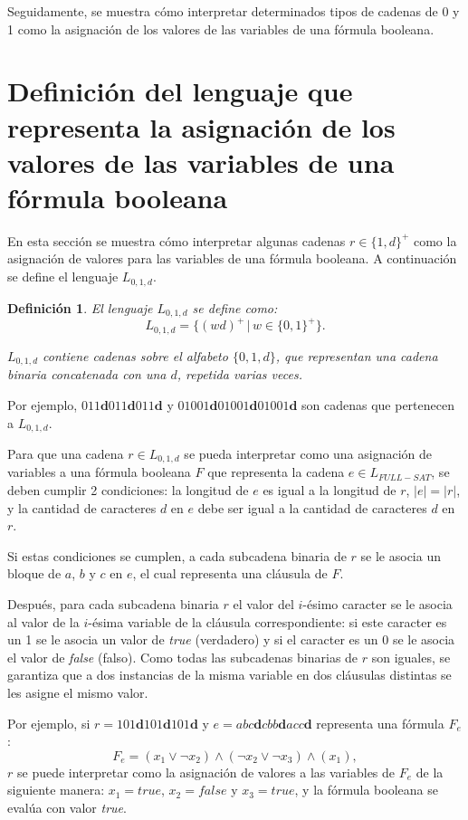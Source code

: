 \documentclass[12pt]{article}
\newtheorem{definition}{Definición}
\newcommand{\true}{\textit{true}}
\newcommand{\false}{\textit{false}}
\begin{document}
Seguidamente, se muestra cómo interpretar determinados tipos de cadenas de 0 y 1 como la asignación de los valores de las variables de una fórmula booleana.

\section{Definición del lenguaje que representa la asignación de los valores de las variables de una fórmula booleana}
\label{sec:intsat}

En esta sección se muestra cómo interpretar algunas cadenas $r\in \{1,d\}^+$ como la asignación de valores para las variables de una fórmula booleana.
A continuación se define el lenguaje $L_{0,1,d}$.


\begin{definition}
    El lenguaje $L_{0,1,d}$ se define como:
    $$L_{0,1,d}=\{(wd)^+\,|\,w\in\{0,1\}^+\}.$$
    
    $L_{0,1,d}$ contiene cadenas sobre el alfabeto $\{0,1,d\}$, que representan una cadena binaria concatenada con una $d$,
    repetida varias veces.
\end{definition}

Por ejemplo, $011\mathbf{d}011\mathbf{d}011\mathbf{d}$ y $01001\mathbf{d}01001\mathbf{d}01001\mathbf{d}$ son cadenas que pertenecen a
$L_{0,1,d}$.

Para que una cadena $r\in L_{0,1,d}$ se pueda interpretar como una asignación de variables a una fórmula booleana $F$ que representa la cadena $e\in L_{FULL-SAT}$, se deben cumplir 2 condiciones: la longitud de $e$ es igual a la longitud de $r$, $|e|=|r|$, y la cantidad de caracteres $d$ en $e$ debe ser igual a la cantidad de caracteres $d$ en $r$. 

Si estas condiciones se cumplen, a cada subcadena binaria de $r$ se le asocia un bloque de $a$, $b$ y $c$ en $e$, el cual representa una cláusula de $F$.

Después, para cada subcadena binaria $r$ el valor del $i$-ésimo caracter se le asocia al valor de la $i$-ésima variable de la cláusula correspondiente: si este caracter es un 1 se le asocia un valor de \true{} (verdadero) y si el caracter es un 0 se le asocia el valor de \false{} (falso). Como todas las subcadenas binarias de $r$ son iguales, se garantiza que a dos instancias de la misma variable en dos cláusulas distintas se les asigne el mismo valor.

Por ejemplo, si $r=101\mathbf{d}101\mathbf{d}101\mathbf{d}$ y $e=abc\mathbf{d}cbb\mathbf{d}acc\mathbf{d}$ representa una fórmula $F_e$:
$$F_e=(x_1\vee\neg x_2)\wedge (\neg x_2 \vee \neg x_3)\wedge (x_1),$$
$r$ se puede interpretar como la asignación de valores a las variables de $F_e$ de la 
siguiente manera: $x_1=true$, $x_2=false$ y $x_3=true$, y la fórmula booleana se evalúa con valor \true{}.
\end{document}

